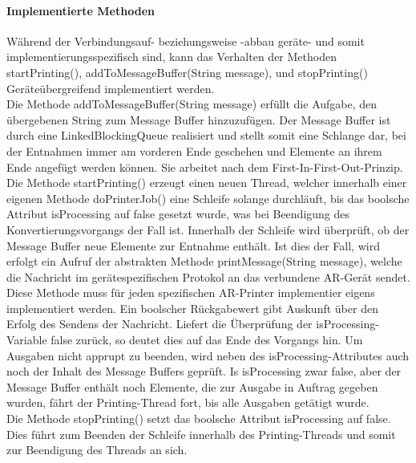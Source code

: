 \paragraph{Implementierte Methoden}
Während der Verbindungsauf- beziehungsweise -abbau geräte- und somit implementierungsspezifisch sind, kann das Verhalten der Methoden startPrinting(), addToMessageBuffer(String message),  und stopPrinting() Geräteübergreifend implementiert werden.\\
Die Methode addToMessageBuffer(String message) erfüllt die Aufgabe, den übergebenen String zum Message Buffer hinzuzufügen. Der Message Buffer ist durch eine LinkedBlockingQueue realisiert und stellt somit eine Schlange dar, bei der Entnahmen immer am vorderen Ende geschehen und Elemente an ihrem Ende angefügt werden können. Sie arbeitet nach dem First-In-First-Out-Prinzip.\\
Die Methode startPrinting() erzeugt einen neuen Thread, welcher innerhalb einer eigenen Methode doPrinterJob() eine Schleife solange durchläuft, bis das boolsche Attribut isProcessing auf false gesetzt wurde, was bei Beendigung des Konvertierungsvorgangs der Fall ist.
Innerhalb der Schleife wird überprüft, ob der Message Buffer neue Elemente zur Entnahme enthält. Ist dies der Fall, wird erfolgt ein Aufruf der abstrakten Methode printMessage(String message), welche die Nachricht im gerätespezifischen Protokol an das verbundene AR-Gerät sendet. Diese Methode muss für jeden spezifischen AR-Printer implementier eigens implementiert werden. Ein boolscher Rückgabewert gibt Auskunft über den Erfolg des Sendens der Nachricht. Liefert die Überprüfung der isProcessing-Variable false zurück, so deutet dies auf das Ende des Vorgangs hin. Um Ausgaben nicht apprupt zu beenden, wird neben des isProcessing-Attributes auch noch der Inhalt des Message Buffers geprüft. Is isProcessing zwar false, aber der Message Buffer enthält noch Elemente, die zur Ausgabe in Auftrag gegeben wurden, fährt der Printing-Thread fort, bis alle Ausgaben getätigt wurde.\\
Die Methode stopPrinting() setzt das boolsche Attribut isProcessing auf false. Dies führt zum Beenden der Schleife innerhalb des Printing-Threads und somit zur Beendigung des Threads an sich.
